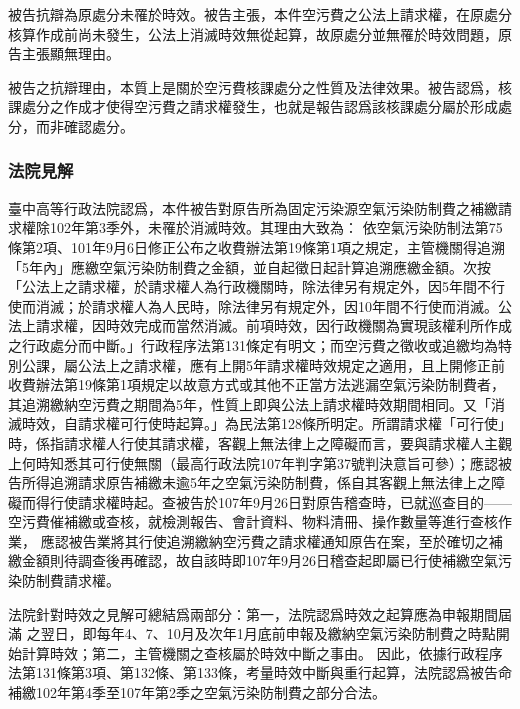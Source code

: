\documentclass[11pt,a4paper]{article}
\begin{document}
被告抗辯為原處分未罹於時效。被告主張，本件空污費之公法上請求權，在原處分核算作成前尚未發生，公法上消滅時效無從起算，故原處分並無罹於時效問題，原告主張顯無理由。

被告之抗辯理由，本質上是關於空污費核課處分之性質及法律效果。被告認爲，核課處分之作成才使得空污費之請求權發生，也就是報告認爲該核課處分屬於形成處分，而非確認處分。


\subsubsection{法院見解}

臺中高等行政法院認爲，本件被告對原告所為固定污染源空氣污染防制費之補繳請求權除102年第3季外，未罹於消滅時效。其理由大致為：
依空氣污染防制法第75條第2項、101年9月6日修正公布之收費辦法第19條第1項之規定，主管機關得追溯「5年內」應繳空氣污染防制費之金額，並自起徵日起計算追溯應繳金額。次按「公法上之請求權，於請求權人為行政機關時，除法律另有規定外，因5年間不行使而消滅；於請求權人為人民時，除法律另有規定外，因10年間不行使而消滅。公法上請求權，因時效完成而當然消滅。前項時效，因行政機關為實現該權利所作成之行政處分而中斷。」行政程序法第131條定有明文；而空污費之徵收或追繳均為特別公課，屬公法上之請求權，應有上開5年請求權時效規定之適用，且上開修正前收費辦法第19條第1項規定以故意方式或其他不正當方法逃漏空氣污染防制費者，其追溯繳納空污費之期間為5年，性質上即與公法上請求權時效期間相同。又「消滅時效，自請求權可行使時起算。」為民法第128條所明定。所謂請求權「可行使」時，係指請求權人行使其請求權，客觀上無法律上之障礙而言，要與請求權人主觀上何時知悉其可行使無關（最高行政法院107年判字第37號判決意旨可參）；應認被告所得追溯請求原告補繳未逾5年之空氣污染防制費，係自其客觀上無法律上之障礙而得行使請求權時起。查被告於107年9月26日對原告稽查時，已就巡查目的——空污費催補繳或查核，就檢測報告、會計資料、物料清冊、操作數量等進行查核作業，
應認被告業將其行使追溯繳納空污費之請求權通知原告在案，至於確切之補繳金額則待調查後再確認，故自該時即107年9月26日稽查起即屬已行使補繳空氣污染防制費請求權。

法院針對時效之見解可總結爲兩部分：第一，法院認爲時效之起算應為申報期間屆滿
之翌日，即每年4、7、10月及次年1月底前申報及繳納空氣污染防制費之時點開始計算時效；第二，主管機關之查核屬於時效中斷之事由。
因此，依據行政程序法第131條第3項、第132條、第133條，考量時效中斷與重行起算，法院認爲被告命補繳102年第4季至107年第2季之空氣污染防制費之部分合法。

\end{document}

